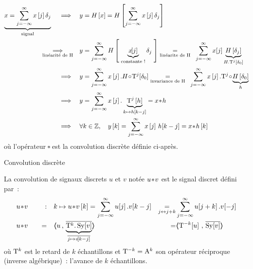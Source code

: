 \begin{align}
  \label{eq:reponse_convolution}
  \caCest{x = \somme{j=-\infty}{\infty}{x\b{j}\delta_{j}}}{\text{signal}}\quad \implies\quad &y=H\b{x}=H\b{\somme{j=-\infty}{\infty}{x\b{j}\delta_{j}}} \nonumber\\
  \underset{\text{linéarité de H}}{\implies}\quad &y=\somme{j=-\infty}{\infty}{H\b{ \;\caCest{x\!\!\b{j}}{\text{constante !}}\delta_{j}\;}} \underset{\text{linéarite de H}}{=} \;\;\somme{j=-\infty}{\infty}{x\!\b{j}\caCest{H\b{\delta_j}}{H.\oret^j\b{\delta_0}}} \nonumber \\
  \implies \quad &y=\somme{j=-\infty}{\infty}{x\b{j}.H\compo\oret^j\!\b{\delta_{0}}} \underset{\text{invariance de H}}{=} \;\;\somme{j=-\infty}{\infty}{x\b{j}.\oret^j\compo\caCest{H\b{\delta_{0}}}{h}}\nonumber\\
  \implies \quad & y= \somme{j=-\infty}{\infty}{x\b{j}.\caCest{\oret^j\b{h}}{k\mapsto h\b{k-j}}}=x\conv h \nonumber\\
  \implies \quad & \forall k\in\Z,\quad  y\b{k}= \somme{j=-\infty}{\infty}{x\b{j}\,h\!\b{k-j}} = x\conv h\b{k}
\end{align}
où l'opérateur $\!\ast\!$ est la convolution discrète définie ci-après.

\begin{definition}{Convolution discrète}
  \label{def:convolution_discrete}
  
  La convolution de signaux discrets $u$ et $v$ notée $u\!\ast\! v$ est le
  signal discret défini par~:
  \begin{align}
    \label{eq:convolution_discrete}
    &u\conv v \quad &:& \quad k \mapsto u\conv v\b{k} =\somme{j=-\infty}{\infty}{u\ded{j}.v\ded{k-j}} &\underset{j\leftrightarrow j+k}{=}&  \somme{j=-\infty}{\infty}{u\ded{j+k}.v\ded{-j}} \nonumber\\
    &u\conv v \quad & = &\quad\scald{u}{\caCest{\conj{\oret^k.\,\Sy\ded{v}}}{\conj{j\mapsto v\ded{k-j}}}} &=& \scald{\oret^{-k}\ded{u}}{\conj{\Sy\ded{v}}} 
  \end{align}
  où $\mathrm{T}^k$ est le retard de $k$ échantillons et
  $\mathrm{T}^{-k}=\mathrm{A}^k$ son opérateur réciproque (inverse
  algébrique)~: l'avance de $k$ échantillons.
\end{definition}

